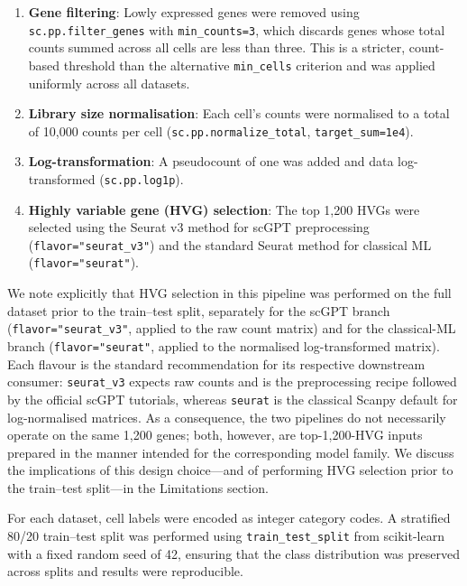 \documentclass[11pt,a4paper]{article}
\makeatletter
\renewcommand\subsection{\@startsection{subsection}{2}{\z@}{-3.25ex plus -1ex minus -.2ex}{1.5ex plus .2ex}{\normalfont\normalsize\bfseries}}
\makeatother
\begin{document}
\begin{enumerate}
    \item \textbf{Gene filtering}: Lowly expressed genes were removed using \texttt{sc.pp.filter\_genes} with \texttt{min\_counts=3}, which discards genes whose total counts summed across all cells are less than three. This is a stricter, count-based threshold than the alternative \texttt{min\_cells} criterion and was applied uniformly across all datasets.
    \item \textbf{Library size normalisation}: Each cell's counts were normalised to a total of 10,000 counts per cell (\texttt{sc.pp.normalize\_total}, \texttt{target\_sum=1e4}).
    \item \textbf{Log-transformation}: A pseudocount of one was added and data log-transformed (\texttt{sc.pp.log1p}).
    \item \textbf{Highly variable gene (HVG) selection}: The top 1,200 HVGs were selected using the Seurat v3 method for scGPT preprocessing (\texttt{flavor="seurat\_v3"}) and the standard Seurat method for classical ML (\texttt{flavor="seurat"}).
\end{enumerate}

We note explicitly that HVG selection in this pipeline was performed on the full dataset prior to the train--test split, separately for the scGPT branch (\texttt{flavor="seurat\_v3"}, applied to the raw count matrix) and for the classical-ML branch (\texttt{flavor="seurat"}, applied to the normalised log-transformed matrix). Each flavour is the standard recommendation for its respective downstream consumer: \texttt{seurat\_v3} expects raw counts and is the preprocessing recipe followed by the official scGPT tutorials, whereas \texttt{seurat} is the classical Scanpy default for log-normalised matrices. As a consequence, the two pipelines do not necessarily operate on the same 1{,}200 genes; both, however, are top-1{,}200-HVG inputs prepared in the manner intended for the corresponding model family. We discuss the implications of this design choice---and of performing HVG selection prior to the train--test split---in the Limitations section.

\subsection{Train--Test Split}

For each dataset, cell labels were encoded as integer category codes. A stratified 80/20 train--test split was performed using \texttt{train\_test\_split} from scikit-learn \citep{Pedregosa2011} with a fixed random seed of 42, ensuring that the class distribution was preserved across splits and results were reproducible.
\end{document}
